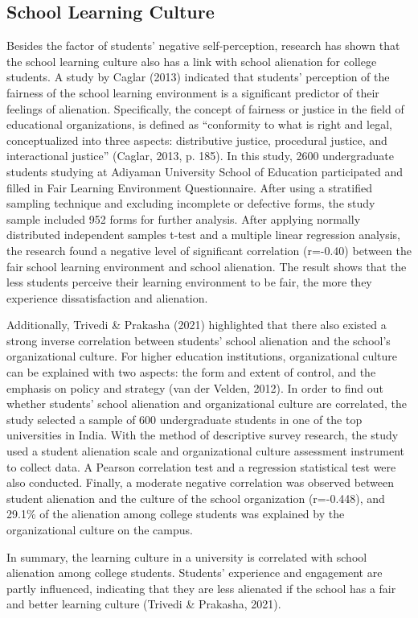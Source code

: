 \documentclass{studentpaper}
\begin{document}
\subsection{School Learning Culture}
\par
Besides the factor of students’ negative self-perception, research has shown that 
the school learning culture also has a link with school alienation for college students. A study by 
Caglar (2013) indicated that students’ perception of the fairness of the school learning 
environment is a significant predictor of their feelings of alienation. Specifically, the concept of 
fairness or justice in the field of educational organizations, is defined as “conformity to what is 
right and legal, conceptualized into three aspects: distributive justice, procedural justice, and 
interactional justice” (Caglar, 2013, p. 185). In this study, 2600 undergraduate students studying 
at Adiyaman University School of Education participated and filled in Fair Learning 
Environment Questionnaire. After using a stratified sampling technique and excluding 
incomplete or defective forms, the study sample included 952 forms for further analysis. After 
applying normally distributed independent samples t-test and a multiple linear regression 
analysis, the research found a negative level of significant correlation (r=-0.40) between the fair 
school learning environment and school alienation. The result shows that the less students 
perceive their learning environment to be fair, the more they experience dissatisfaction and 
alienation.
\par
Additionally, Trivedi \& Prakasha (2021) highlighted that there also existed a strong 
inverse correlation between students’ school alienation and the school’s organizational culture. 
For higher education institutions, organizational culture can be explained with two aspects: the 
form and extent of control, and the emphasis on policy and strategy (van der Velden, 2012). In 
order to find out whether students’ school alienation and organizational culture are correlated, the 
study selected a sample of 600 undergraduate students in one of the top universities in India. 
With the method of descriptive survey research, the study used a student alienation scale and 
organizational culture assessment instrument to collect data. A Pearson correlation test and a 
regression statistical test were also conducted. Finally, a moderate negative correlation was 
observed between student alienation and the culture of the school organization (r=-0.448), and 
29.1\% of the alienation among college students was explained by the organizational culture on 
the campus.
\par
In summary, the learning culture in a university is correlated with school alienation 
among college students. Students’ experience and engagement are partly influenced, indicating 
that they are less alienated if the school has a fair and better learning culture (Trivedi \& 
Prakasha, 2021). 
\end{document}
